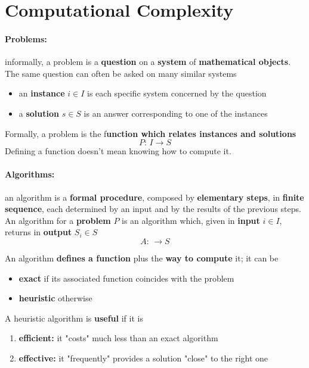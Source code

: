 \section{Computational Complexity}
\paragraph{Problems:} informally, a problem is a \textbf{question} on a \textbf{system} of \textbf{mathematical objects}. The same question can often be asked on many similar systems
\begin{itemize}
	\item an \textbf{instance} $i \in I$ is each specific system concerned by the question 
	\item a \textbf{solution} $s \in S$ is an answer corresponding to one of the instances
\end{itemize}
Formally, a problem is the f\textbf{unction which relates instances and solutions}
$$ P : \, I \rightarrow S $$
Defining a function doesn't mean knowing how to compute it.\\

\paragraph{Algorithms:} an algorithm is a \textbf{formal procedure}, composed by \textbf{elementary steps}, in \textbf{finite sequence}, each determined by an input and by the results of the previous steps.\\

An algorithm for a \textbf{problem} $P$ is an algorithm which, given in \textbf{input} $i \in I$, returns in \textbf{output} $S_i \in S$
$$ A : \, \rightarrow S $$

An algorithm \textbf{defines a function} plus the \textbf{way to compute} it; it can be
\begin{itemize}
	\item \textbf{exact} if its associated function coincides with the problem
	\item \textbf{heuristic} otherwise
\end{itemize}
A heuristic algorithm is \textbf{useful} if it is
\begin{enumerate}
	\item \textbf{efficient:} it "costs" much less than an exact algorithm
	\item \textbf{effective:} it "frequently" provides a solution "close" to the right one
\end{enumerate}

